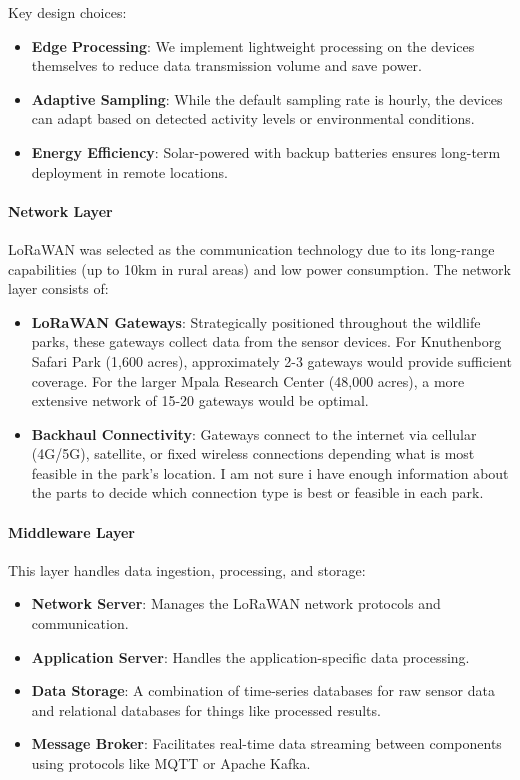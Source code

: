 Key design choices:
\begin{itemize}
  \item \textbf{Edge Processing}: We implement lightweight processing on the devices themselves to reduce data transmission volume and save power.
  \item \textbf{Adaptive Sampling}: While the default sampling rate is hourly, the devices can adapt based on detected activity levels or environmental conditions.
  \item \textbf{Energy Efficiency}: Solar-powered with backup batteries ensures long-term deployment in remote locations. %
\end{itemize}

\paragraph{Network Layer}
LoRaWAN was selected as the communication technology due to its long-range capabilities (up to 10km in rural areas) and low power consumption. The network layer consists of:

\begin{itemize}
  \item \textbf{LoRaWAN Gateways}: Strategically positioned throughout the wildlife parks, these gateways collect data from the sensor devices. For Knuthenborg Safari Park (1,600 acres), approximately 2-3 gateways would provide sufficient coverage. For the larger Mpala Research Center (48,000 acres), a more extensive network of 15-20 gateways would be optimal.
  \item \textbf{Backhaul Connectivity}: Gateways connect to the internet via cellular (4G/5G), satellite, or fixed wireless connections depending what is most feasible in the park's location. I am not sure i have enough information about the parts to decide which connection type is best or feasible in each park.
\end{itemize}

\paragraph{Middleware Layer}
This layer handles data ingestion, processing, and storage:

\begin{itemize}
  \item \textbf{Network Server}: Manages the LoRaWAN network protocols and communication.
  \item \textbf{Application Server}: Handles the application-specific data processing.
  \item \textbf{Data Storage}: A combination of time-series databases for raw sensor data and relational databases for things like processed results.
  \item \textbf{Message Broker}: Facilitates real-time data streaming between components using protocols like MQTT or Apache Kafka.
\end{itemize}

